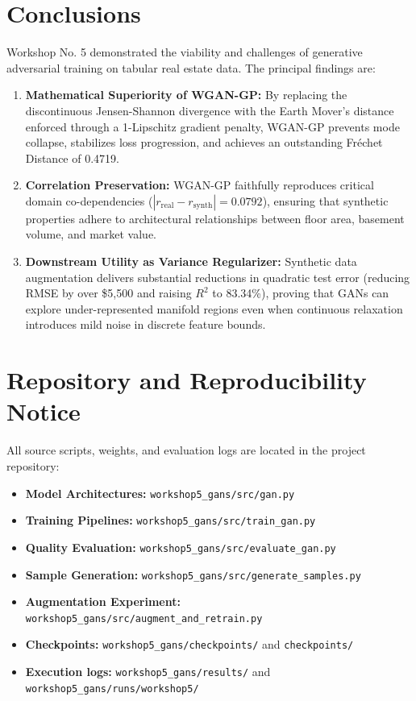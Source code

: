 \documentclass[11pt,letterpaper]{article}
\begin{document}
\section{Conclusions}
Workshop No. 5 demonstrated the viability and challenges of generative adversarial training on tabular real estate data. The principal findings are:
\begin{enumerate}
    \item \textbf{Mathematical Superiority of WGAN-GP:} By replacing the discontinuous Jensen-Shannon divergence with the Earth Mover's distance enforced through a 1-Lipschitz gradient penalty, WGAN-GP prevents mode collapse, stabilizes loss progression, and achieves an outstanding Fr\'echet Distance of 0.4719.
    \item \textbf{Correlation Preservation:} WGAN-GP faithfully reproduces critical domain co-dependencies ($|r_{\text{real}} - r_{\text{synth}}| = 0.0792$), ensuring that synthetic properties adhere to architectural relationships between floor area, basement volume, and market value.
    \item \textbf{Downstream Utility as Variance Regularizer:} Synthetic data augmentation delivers substantial reductions in quadratic test error (reducing RMSE by over \$5,500 and raising $R^2$ to 83.34\%), proving that GANs can explore under-represented manifold regions even when continuous relaxation introduces mild noise in discrete feature bounds.
\end{enumerate}

\section*{Repository and Reproducibility Notice}
All source scripts, weights, and evaluation logs are located in the project repository:
\begin{itemize}
    \item \textbf{Model Architectures:} \texttt{workshop5\_gans/src/gan.py}
    \item \textbf{Training Pipelines:} \texttt{workshop5\_gans/src/train\_gan.py}
    \item \textbf{Quality Evaluation:} \texttt{workshop5\_gans/src/evaluate\_gan.py}
    \item \textbf{Sample Generation:} \texttt{workshop5\_gans/src/generate\_samples.py}
    \item \textbf{Augmentation Experiment:} \texttt{workshop5\_gans/src/augment\_and\_retrain.py}
    \item \textbf{Checkpoints:} \texttt{workshop5\_gans/checkpoints/} and \texttt{checkpoints/}
    \item \textbf{Execution logs:} \texttt{workshop5\_gans/results/} and \texttt{workshop5\_gans/runs/workshop5/}
\end{itemize}
\end{document}
